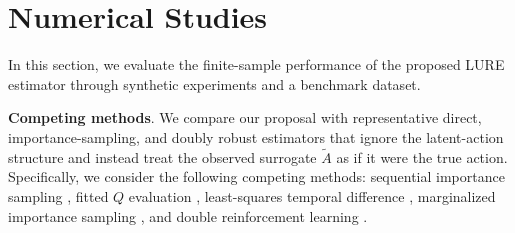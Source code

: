 \documentclass[12pt]{article}
\DeclareMathOperator*{\argmin}{arg\,min}
\newcommand{\0}{\boldsymbol{0}}
\newcommand{\E}{\mathbb{E}}
\begin{document}







\section{Numerical Studies} \label{sec: sim}


In this section, we evaluate the finite-sample performance of the proposed LURE estimator through synthetic experiments and a benchmark dataset. 

\textbf{Competing methods}. We compare our proposal with representative direct, importance-sampling, and doubly robust estimators that ignore the latent-action structure and instead treat the observed surrogate $\widetilde A$ as if it were the true action. Specifically, we consider the following competing methods: sequential importance sampling \citep[SIS,][]{precup2000eligibility}, fitted $Q$ evaluation \citep[FQE,][]{ernst2005tree}, least-squares temporal difference \citep[LSTD,][]{shi2022statistical}, marginalized importance sampling \citep[MIS,][]{uehara2020minimax}, and double reinforcement learning \citep[DRL,][]{kallus2022efficiently}. 
\end{document}
